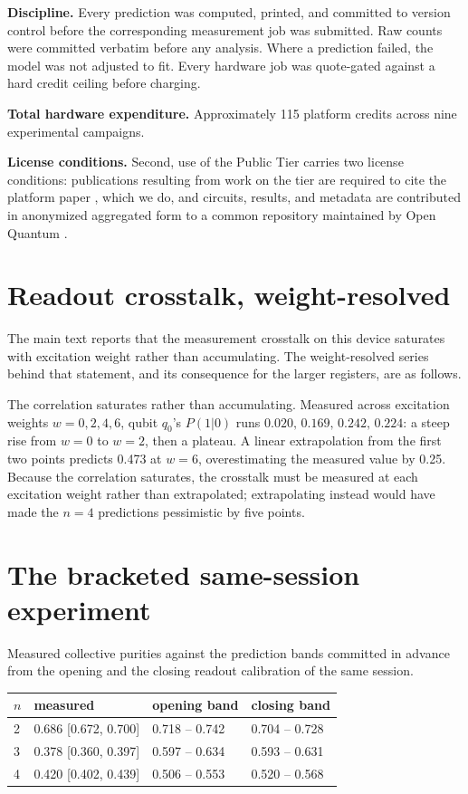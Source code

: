 \textbf{Discipline.} Every prediction was computed, printed, and
committed to version control before the corresponding measurement job
was submitted. Raw counts were committed verbatim before any analysis.
Where a prediction failed, the model was not adjusted to fit. Every
hardware job was quote-gated against a hard credit ceiling before
charging.

\textbf{Total hardware expenditure.} Approximately 115 platform credits
across nine experimental campaigns.

\textbf{License conditions.} Second, use of the Public Tier carries two license conditions:
publications resulting from work on the tier are required to cite the
platform paper \cite{wold2025openquantum}, which we do, and circuits,
results, and metadata are contributed in anonymized aggregated form to a
common repository maintained by Open Quantum \cite{wold2025openquantum}.

\section{Readout crosstalk, weight-resolved}\label{supp:crosstalk}

The main text reports that the measurement crosstalk on this device
saturates with excitation weight rather than accumulating. The
weight-resolved series behind that statement, and its consequence for the
larger registers, are as follows.

The correlation saturates rather than accumulating. Measured across
excitation weights \(w = 0, 2, 4, 6\), qubit \(q_0\)'s \(P(1|0)\) runs
\(0.020,\, 0.169,\, 0.242,\, 0.224\): a steep rise from \(w = 0\) to
\(w = 2\), then a plateau. A linear extrapolation from the first two
points predicts 0.473 at \(w = 6\), overestimating the measured value by
0.25. Because the correlation saturates, the crosstalk must be measured
at each excitation weight rather than extrapolated; extrapolating instead
would have made the \(n = 4\) predictions pessimistic by five points.

\section{The bracketed same-session experiment}\label{supp:bands}

Measured collective purities against the prediction bands committed in
advance from the opening and the closing readout calibration of the same
session.

\begin{table}[htbp]
\centering
\setlength{\tabcolsep}{10pt}
\begin{tabular}{@{}llll@{}}
\toprule
\(n\) & measured & opening band & closing band \\
\midrule
2 & 0.686 {[}0.672, 0.700{]} & 0.718 -- 0.742 & 0.704 -- 0.728 \\
3 & 0.378 {[}0.360, 0.397{]} & 0.597 -- 0.634 & 0.593 -- 0.631 \\
4 & 0.420 {[}0.402, 0.439{]} & 0.506 -- 0.553 & 0.520 -- 0.568 \\
\bottomrule
\end{tabular}
\end{table}

